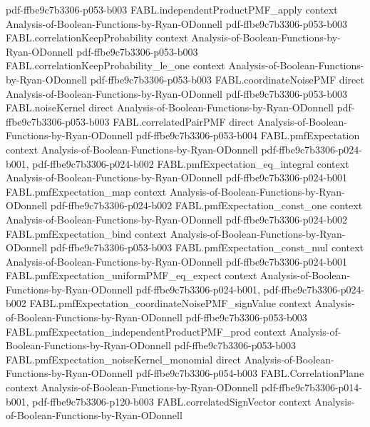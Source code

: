 \begin{theorem}
  {pdf-ffbe9c7b3306-p053-b003}
\proofstep
  {FABL.independentProductPMF_apply}
  {context}
  {Analysis-of-Boolean-Functions-by-Ryan-ODonnell}
  {pdf-ffbe9c7b3306-p053-b003}
\proofstep
  {FABL.correlationKeepProbability}
  {context}
  {Analysis-of-Boolean-Functions-by-Ryan-ODonnell}
  {pdf-ffbe9c7b3306-p053-b003}
\proofstep
  {FABL.correlationKeepProbability_le_one}
  {context}
  {Analysis-of-Boolean-Functions-by-Ryan-ODonnell}
  {pdf-ffbe9c7b3306-p053-b003}
\proofstep
  {FABL.coordinateNoisePMF}
  {direct}
  {Analysis-of-Boolean-Functions-by-Ryan-ODonnell}
  {pdf-ffbe9c7b3306-p053-b003}
\proofstep
  {FABL.noiseKernel}
  {direct}
  {Analysis-of-Boolean-Functions-by-Ryan-ODonnell}
  {pdf-ffbe9c7b3306-p053-b003}
\proofstep
  {FABL.correlatedPairPMF}
  {direct}
  {Analysis-of-Boolean-Functions-by-Ryan-ODonnell}
  {pdf-ffbe9c7b3306-p053-b004}
\proofstep
  {FABL.pmfExpectation}
  {context}
  {Analysis-of-Boolean-Functions-by-Ryan-ODonnell}
  {pdf-ffbe9c7b3306-p024-b001,
    pdf-ffbe9c7b3306-p024-b002}
\proofstep
  {FABL.pmfExpectation_eq_integral}
  {context}
  {Analysis-of-Boolean-Functions-by-Ryan-ODonnell}
  {pdf-ffbe9c7b3306-p024-b001}
\proofstep
  {FABL.pmfExpectation_map}
  {context}
  {Analysis-of-Boolean-Functions-by-Ryan-ODonnell}
  {pdf-ffbe9c7b3306-p024-b002}
\proofstep
  {FABL.pmfExpectation_const_one}
  {context}
  {Analysis-of-Boolean-Functions-by-Ryan-ODonnell}
  {pdf-ffbe9c7b3306-p024-b002}
\proofstep
  {FABL.pmfExpectation_bind}
  {context}
  {Analysis-of-Boolean-Functions-by-Ryan-ODonnell}
  {pdf-ffbe9c7b3306-p053-b003}
\proofstep
  {FABL.pmfExpectation_const_mul}
  {context}
  {Analysis-of-Boolean-Functions-by-Ryan-ODonnell}
  {pdf-ffbe9c7b3306-p024-b001}
\proofstep
  {FABL.pmfExpectation_uniformPMF_eq_expect}
  {context}
  {Analysis-of-Boolean-Functions-by-Ryan-ODonnell}
  {pdf-ffbe9c7b3306-p024-b001,
    pdf-ffbe9c7b3306-p024-b002}
\proofstep
  {FABL.pmfExpectation_coordinateNoisePMF_signValue}
  {context}
  {Analysis-of-Boolean-Functions-by-Ryan-ODonnell}
  {pdf-ffbe9c7b3306-p053-b003}
\proofstep
  {FABL.pmfExpectation_independentProductPMF_prod}
  {context}
  {Analysis-of-Boolean-Functions-by-Ryan-ODonnell}
  {pdf-ffbe9c7b3306-p053-b003}
\proofstep
  {FABL.pmfExpectation_noiseKernel_monomial}
  {direct}
  {Analysis-of-Boolean-Functions-by-Ryan-ODonnell}
  {pdf-ffbe9c7b3306-p054-b003}
\proofstep
  {FABL.CorrelationPlane}
  {context}
  {Analysis-of-Boolean-Functions-by-Ryan-ODonnell}
  {pdf-ffbe9c7b3306-p014-b001,
    pdf-ffbe9c7b3306-p120-b003}
\proofstep
  {FABL.correlatedSignVector}
  {context}
  {Analysis-of-Boolean-Functions-by-Ryan-ODonnell}

\end{theorem}
